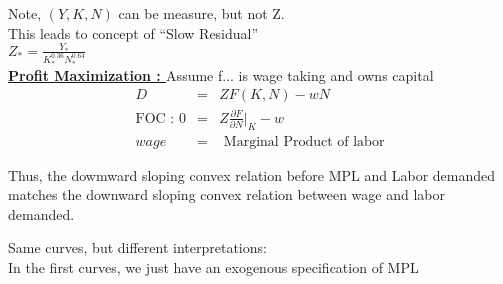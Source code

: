 Note, $(Y, K, N)$ can be measure, but not Z.\\

This leads to concept of ``Slow Residual''\\
$Z_* = \frac{Y_*}{K_*^{0.36} N_*^{0.64}}$\\

\textbf{\underline{Profit Maximization : }} Assume f... is wage taking  and owns capital\\
\begin{eqnarray*}
D &=& ZF(K, N) - wN \\
\mbox{FOC : } 0 &=& Z \frac{\partial F}{\partial N}\vert_K - w\\
wage &=& \mbox{ Marginal Product of labor}
\end{eqnarray*}

Thus, the dowmward sloping convex relation before MPL and Labor demanded matches the downward sloping convex relation between wage and labor demanded.


Same curves, but different interpretations:\\
In the first curves, we just have an exogenous specification of MPL\\

